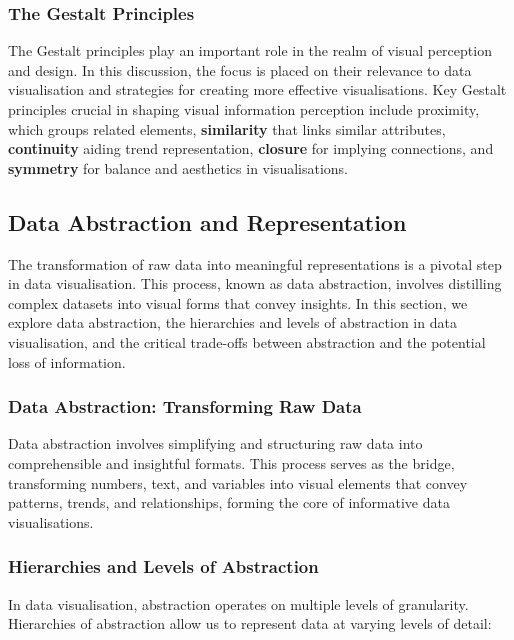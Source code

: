 \documentclass{article}\usepackage[]{graphicx}\usepackage[]{xcolor}
\begin{document}
\subsubsection{The Gestalt Principles}

The Gestalt principles play an important role in the realm of visual perception and design. In this discussion, the focus is placed on their relevance to data visualisation and strategies for creating more effective visualisations. Key Gestalt principles crucial in shaping visual information perception include proximity, which groups related elements, \textbf{similarity} that links similar attributes, \textbf{continuity} aiding trend representation, \textbf{closure} for implying connections, and \textbf{symmetry} for balance and aesthetics in visualisations.


\subsection{Data Abstraction and Representation}

The transformation of raw data into meaningful representations is a pivotal step in data visualisation. This process, known as data abstraction, involves distilling complex datasets into visual forms that convey insights. In this section, we explore data abstraction, the hierarchies and levels of abstraction in data visualisation, and the critical trade-offs between abstraction and the potential loss of information.

\subsubsection{Data Abstraction: Transforming Raw Data}

Data abstraction involves simplifying and structuring raw data into comprehensible and insightful formats. This process serves as the bridge, transforming numbers, text, and variables into visual elements that convey patterns, trends, and relationships, forming the core of informative data visualisations.

\subsubsection{Hierarchies and Levels of Abstraction}

In data visualisation, abstraction operates on multiple levels of granularity. Hierarchies of abstraction allow us to represent data at varying levels of detail:
\end{document}

